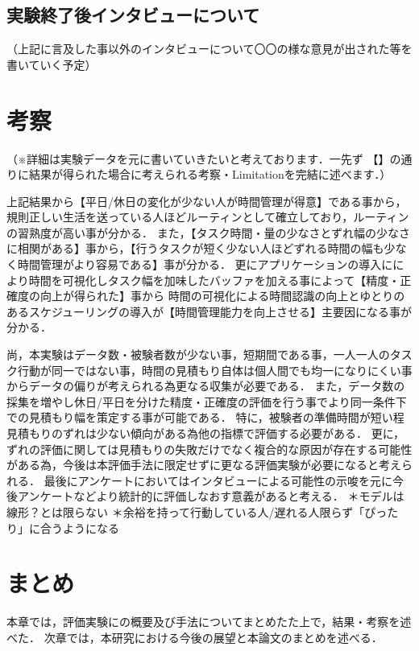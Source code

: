 \subsection{実験終了後インタビューについて}
（上記に言及した事以外のインタビューについて〇〇の様な意見が出された等を書いていく予定）


\section{考察}
（※詳細は実験データを元に書いていきたいと考えております．一先ず
【】の通りに結果が得られた場合に考えられる考察・Limitationを完結に述べます．）

上記結果から【平日/休日の変化が少ない人が時間管理が得意】である事から，規則正しい生活を送っている人ほどルーティンとして確立しており，ルーティンの習熟度が高い事が分かる．
また，【タスク時間・量の少なさとずれ幅の少なさに相関がある】事から，【行うタスクが短く少ない人ほどずれる時間の幅も少なく時間管理がより容易である】事が分かる．
更にアプリケーションの導入ににより時間を可視化しタスク幅を加味したバッファを加える事によって【精度・正確度の向上が得られた】事から
時間の可視化による時間認識の向上とゆとりのあるスケジューリングの導入が【時間管理能力を向上させる】主要因になる事が分かる．

尚，本実験はデータ数・被験者数が少ない事，短期間である事，一人一人のタスク行動が同一ではない事，時間の見積もり自体は個人間でも均一になりにくい事からデータの偏りが考えられる為更なる収集が必要である．
また，データ数の採集を増やし休日/平日を分けた精度・正確度の評価を行う事でより同一条件下での見積もり幅を策定する事が可能である．
特に，被験者の準備時間が短い程見積もりのずれは少ない傾向がある為他の指標で評価する必要がある．
更に，ずれの評価に関しては見積もりの失敗だけでなく複合的な原因が存在する可能性がある為，今後は本評価手法に限定せずに更なる評価実験が必要になると考えられる．
最後にアンケートにおいてはインタビューによる可能性の示唆を元に今後アンケートなどより統計的に評価しなおす意義があると考える．
＊モデルは線形？とは限らない
＊余裕を持って行動している人/遅れる人限らず「ぴったり」に合うようになる

\section{まとめ}
本章では，評価実験にの概要及び手法についてまとめたた上で，結果・考察を述べた．
次章では，本研究における今後の展望と本論文のまとめを述べる．
